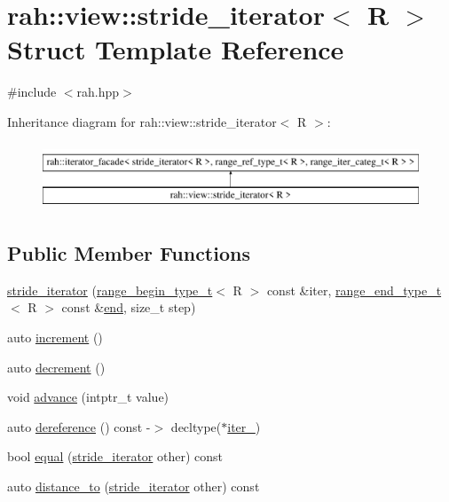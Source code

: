 \hypertarget{structrah_1_1view_1_1stride__iterator}{}\section{rah\+::view\+::stride\+\_\+iterator$<$ R $>$ Struct Template Reference}
\label{structrah_1_1view_1_1stride__iterator}


{\ttfamily \#include $<$rah.\+hpp$>$}

Inheritance diagram for rah\+::view\+::stride\+\_\+iterator$<$ R $>$\+:\begin{figure}[H]
\begin{center}
\leavevmode
\includegraphics[height=2.000000cm]{structrah_1_1view_1_1stride__iterator}
\end{center}
\end{figure}
\subsection*{Public Member Functions}
\begin{DoxyCompactItemize}
\item 
\mbox{\hyperlink{structrah_1_1view_1_1stride__iterator_a47ddd2ce0f295fa825919f04431d64a9}{stride\+\_\+iterator}} (\mbox{\hyperlink{namespacerah_a28aff4eeddcece6be65ff0b956d32d4a}{range\+\_\+begin\+\_\+type\+\_\+t}}$<$ R $>$ const \&iter, \mbox{\hyperlink{namespacerah_a9657e24ae477f4482225b133fe286b65}{range\+\_\+end\+\_\+type\+\_\+t}}$<$ R $>$ const \&\mbox{\hyperlink{namespacerah_ac309d041d5f4110ecf2d1b44f4282275}{end}}, size\+\_\+t step)
\item 
auto \mbox{\hyperlink{structrah_1_1view_1_1stride__iterator_ae98465362884b064db4184a406221154}{increment}} ()
\item 
auto \mbox{\hyperlink{structrah_1_1view_1_1stride__iterator_a8104aed5699a5f26626c8a010a97f5f4}{decrement}} ()
\item 
void \mbox{\hyperlink{structrah_1_1view_1_1stride__iterator_aede4ba99f4ede1afdad678bd0dba4f7b}{advance}} (intptr\+\_\+t value)
\item 
auto \mbox{\hyperlink{structrah_1_1view_1_1stride__iterator_a8db124e5f1f4260387c40336712b1566}{dereference}} () const -\/$>$ decltype($\ast$\mbox{\hyperlink{structrah_1_1view_1_1stride__iterator_a65e7fa92e8026ce48e3c132e808e9ffc}{iter\+\_\+}})
\item 
bool \mbox{\hyperlink{structrah_1_1view_1_1stride__iterator_a34c24e935ee7beebcd7269ee314e245a}{equal}} (\mbox{\hyperlink{structrah_1_1view_1_1stride__iterator}{stride\+\_\+iterator}} other) const
\item 
auto \mbox{\hyperlink{structrah_1_1view_1_1stride__iterator_ad30be3983aec3fab52efb32a1a461056}{distance\+\_\+to}} (\mbox{\hyperlink{structrah_1_1view_1_1stride__iterator}{stride\+\_\+iterator}} other) const
\end{DoxyCompactItemize}
